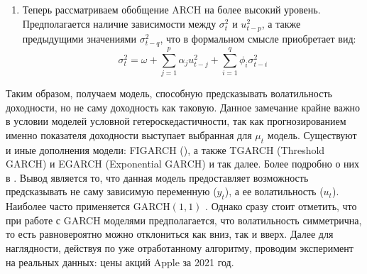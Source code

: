 \begin{enumerate}
	\item Теперь рассматриваем обобщение ARCH на более высокий уровень. Предполагается наличие зависимости между $\sigma^2_t$ и $u^2_{t - p}$, а также предыдущими значениями $\sigma^2_{t - q}$, что в формальном смысле приобретает вид:
	\begin{equation}
		\sigma^2_t = \omega + \sum_{j = 1}^p \alpha_j u_{t - j}^2 + \sum_{i = 1}^q \phi_i \sigma^2_{t - i}
	\end{equation}
\end{enumerate}
Таким образом, получаем модель, способную предсказывать волатильность доходности, но не саму доходность как таковую. Данное замечание крайне важно в условии моделей условной гетероскедастичности, так как прогнозированием именно показателя доходности выступает выбранная для $\mu_t$ модель. Существуют и иные дополнения модели: FIGARCH (), а также TGARCH (Threshold GARCH) и EGARCH (Exponential GARCH) и так далее. Более подробно о них в \cite{verbik_econometrics_garchs}. Вывод является то, что данная модель предоставляет возможность предсказывать не саму зависимую переменную ($y_t$), а ее волатильность ($u_t$). Наиболее часто применяется GARCH$(1, 1)$ \cite{hansen2005forecast}. Однако сразу стоит отметить, что при работе с GARCH моделями предполагается, что волатильность симметрична, то есть равновероятно можно отклониться как вниз, так и вверх. Далее для наглядности, действуя по уже отработанному алгоритму, проводим эксперимент на реальных данных: цены акций Apple за 2021 год.\\

